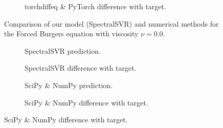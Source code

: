 \begin{figure}[H]
\begin{adjustwidth}{-0.05\linewidth}{-0.05\linewidth}
\begin{subfigure}{0.49\linewidth}
    \end{subfigure}
    \begin{subfigure}{0.49\linewidth}
      \begin{adjustbox}{width=\linewidth}
        
      \end{adjustbox}
      \caption{torchdiffeq \& PyTorch difference with target.}\label{fig:comp_tdo_diff_0.0}
    \end{subfigure}
  \end{adjustwidth}
  \caption{Comparison of our model (SpectralSVR) and numerical methods for the Forced Burgers equation with viscosity \(\nu=0.0\).}\label{fig:comparison_burgers_0.0}
\end{figure}

\begin{figure}[H]
  \centering
  \begin{adjustwidth}{-0.05\linewidth}{-0.05\linewidth}
    \begin{subfigure}{0.49\linewidth}
      \begin{adjustbox}{width=\linewidth}
        
      \end{adjustbox}
      \caption{SpectralSVR prediction.}\label{fig:comp_model_pred_0.01}
    \end{subfigure}
    \begin{subfigure}{0.49\linewidth}
      \begin{adjustbox}{width=\linewidth}
        
      \end{adjustbox}
      \caption{SpectralSVR difference with target.}\label{fig:comp_model_diff_0.01}
    \end{subfigure}
    \begin{subfigure}{0.49\linewidth}
      \begin{adjustbox}{width=\linewidth}
        
      \end{adjustbox}
      \caption{SciPy \& NumPy prediction.}\label{fig:comp_spo_pred_0.01}
    \end{subfigure}
    \begin{subfigure}{0.49\linewidth}
      \begin{adjustbox}{width=\linewidth}
        
      \end{adjustbox}
      \caption{SciPy \& NumPy difference with target.}\label{fig:comp_spo_diff_0.01}

\end{subfigure}
\end{adjustwidth}
\end{figure}
